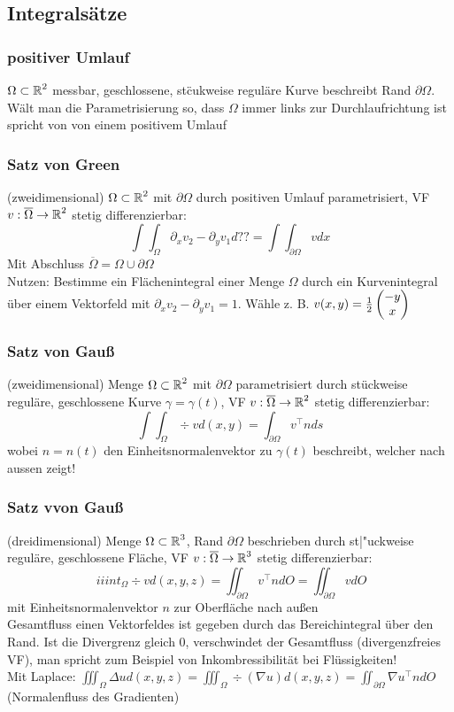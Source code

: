 \documentclass[german]{latex4ei/latex4ei_sheet}
\begin{document}
\subsection{Integrals\"atze}
\subsubsection{positiver Umlauf}
$\Omega \subset \operatorname{\mathbb R}^2$ messbar, geschlossene, st\"cukweise regul\"are Kurve beschreibt Rand $\partial \Omega$. W\"alt man die Parametrisierung so, dass $\Omega$ immer links zur Durchlaufrichtung ist spricht von von einem positivem Umlauf
\subsubsection{Satz von Green} (zweidimensional)
$\Omega \subset \operatorname{\mathbb R}^2$ mit $\partial \Omega$ durch positiven Umlauf parametrisiert, VF $v: \overline{\Omega} \to \operatorname{\mathbb R}^2$ stetig differenzierbar:
\[\int \int_\Omega \partial_x v_2 - \partial_y v_1 d ??=\int \int_{\partial \Omega} v d x\]
Mit Abschluss $\overline{\Omega}=\Omega \cup \partial \Omega$\\
Nutzen: Bestimme ein Fl\"achenintegral einer Menge $\Omega$ durch ein Kurvenintegral \"uber einem Vektorfeld mit $\partial_x v_2 - \partial_y v_1=1$. W\"ahle z. B. $v(x,y)=\frac{1}{2} \begin{pmatrix} -y \\ x \end{pmatrix}$

\subsubsection{Satz von Gau\ss{}} (zweidimensional)
Menge $\Omega \subset \operatorname{\mathbb R}^2$ mit $\partial \Omega$ parametrisiert durch st\"uckweise regul\"are, geschlossene Kurve $\gamma=\gamma(t)$, VF $v:\overline{\Omega} \to \operatorname{\mathbb R}^2$ stetig differenzierbar:\\
\[\int \int_\Omega \div v d(x,y)=\int_{\partial \Omega} v^\top n d s\] wobei $n=n(t)$ den Einheitsnormalenvektor zu $\gamma(t)$ beschreibt, welcher nach aussen zeigt!
\subsubsection{Satz vvon Gau\ss{}} (dreidimensional)
Menge $\Omega \subset \operatorname{\mathbb R}^3$, Rand $\partial \Omega$ beschrieben durch st|"uckweise regul\"are, geschlossene Fl\"ache, VF $ v:\overline{\Omega}\to \operatorname{\mathbb R}^3$ stetig differenzierbar:
\[\ iiint_\Omega \div v d(x,y,z)=\iint_{\partial \Omega} v^\top n d O=\iint_{\partial \Omega} v d O\] mit Einheitsnormalenvektor $n$ zur Oberfl\"ache nach au\ss{}en\\
Gesamtfluss einen Vektorfeldes ist gegeben durch das Bereichintegral \"uber den Rand. Ist die Divergrenz gleich 0, verschwindet der Gesamtfluss (divergenzfreies VF), man spricht zum Beispiel von Inkombressibilit\"at bei Fl\"ussigkeiten!\\
Mit Laplace: $\iiint_\Omega \Delta u d(x,y,z)=\iiint_\Omega \div(\nabla u) d(x,y,z)=\iint_{\partial \Omega} \nabla u^\top n d O$ (Normalenfluss des Gradienten)
\end{document}
